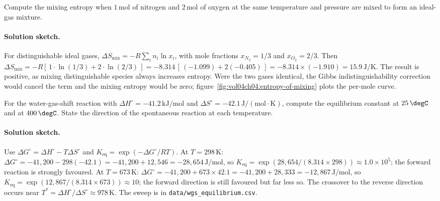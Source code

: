 \begin{exercise}
Compute the mixing entropy when $1\,\text{mol}$ of nitrogen and
$2\,\text{mol}$ of oxygen at the same temperature and pressure are
mixed to form an ideal-gas mixture.

\paragraph{Solution sketch.} For distinguishable ideal gases,
$\Delta S_{\text{mix}} = -R \sum_i n_i \ln x_i$, with mole fractions
$x_{N_2} = 1/3$ and $x_{O_2} = 2/3$. Then
$\Delta S_{\text{mix}} = -R[\,1 \cdot \ln(1/3) + 2 \cdot \ln(2/3)\,]
= -8.314\,[\,(-1.099) + 2(-0.405)\,]
= -8.314 \times (-1.910) = 15.9\,\si{\joule\per\kelvin}$.
The result is positive, as mixing distinguishable species always
increases entropy. Were the two gases identical, the Gibbs
indistinguishability correction would cancel the term and the mixing
entropy would be zero; figure~\ref{fig:vol04ch04:entropy-of-mixing}
plots the per-mole curve.
\end{exercise}

\begin{exercise}
For the water-gas-shift reaction with $\Delta H^\circ = -41.2\,
\text{kJ}/\text{mol}$ and $\Delta S^\circ = -42.1\,\text{J}/(\text{mol}
\cdot\si{\kelvin})$, compute the equilibrium constant at $25\,\degC$
and at $400\,\degC$. State the direction of the spontaneous reaction
at each temperature.

\paragraph{Solution sketch.} Use $\Delta G^\circ = \Delta H^\circ -
T\Delta S^\circ$ and $K_{\text{eq}} = \exp(-\Delta G^\circ/RT)$.
At $T = 298\,\si{\kelvin}$:
$\Delta G^\circ = -41{,}200 - 298(-42.1) = -41{,}200 + 12{,}546 =
-28{,}654\,\text{J}/\text{mol}$, so
$K_{\text{eq}} = \exp(28{,}654/(8.314 \times 298)) \approx 1.0 \times
10^{5}$; the forward reaction is strongly favoured.
At $T = 673\,\si{\kelvin}$:
$\Delta G^\circ = -41{,}200 + 673 \times 42.1 = -41{,}200 + 28{,}333 =
-12{,}867\,\text{J}/\text{mol}$, so
$K_{\text{eq}} = \exp(12{,}867/(8.314 \times 673)) \approx 10$; the
forward direction is still favoured but far less so. The crossover to
the reverse direction occurs near
$T^\ast = \Delta H^\circ/\Delta S^\circ \approx 978\,\si{\kelvin}$.
The sweep is in \texttt{data/wgs\_equilibrium.csv}.
\end{exercise}

